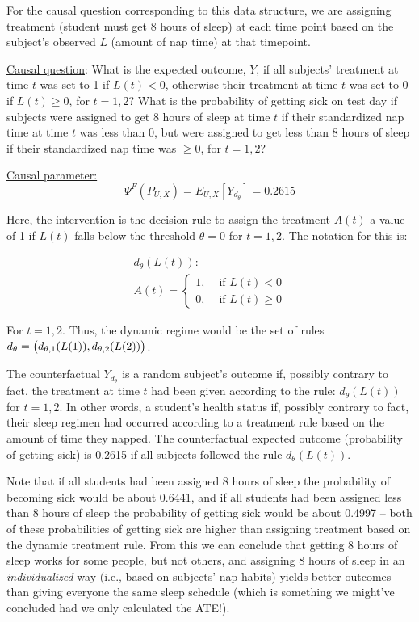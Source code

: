 \documentclass{exam}
\begin{document}
For the causal question corresponding to this data structure, we are assigning treatment (student must get 8 hours of sleep) at each time point based on the subject's observed $L$ (amount of nap time) at that timepoint.

\underline{Causal question}: What is the expected outcome, $Y$, if all subjects' treatment at time $t$ was set to 1 if $L(t) < 0$, otherwise their treatment at time $t$ was set to 0 if $L(t) \geq 0$, for $t = 1,2$? What is the probability of getting sick on test day if subjects were assigned to get 8 hours of sleep at time $t$ if their standardized nap time at time $t$ was less than 0, but were assigned to get less than 8 hours of sleep if their standardized nap time was $\geq 0$, for $t = 1,2$?


\underline{Causal parameter:} 
\[
\Psi^F(P_{U,X}) = E_{U,X}[Y_{d_\theta}] = 0.2615
\]

Here, the intervention is the decision rule to assign the treatment $A(t)$ a value of 1 if $L(t)$ falls below the threshold $\theta = 0$ for $t = 1,2$. The notation for this is:

\begin{align*}
d_\theta(L(t)): \\
A(t) = 
    \begin{cases}
      1, & \text{ if } L(t) < 0 \\
      0, & \text{ if } L(t) \geq 0
    \end{cases}
\end{align*}

For $t = 1,2$. Thus, the dynamic regime would be the set of rules $d_\theta = \big{(}d_{\theta,1}(L(1)), d_{\theta,2}(L(2))\big{)}$.

The counterfactual $Y_{d_\theta}$ is a random subject's outcome if, possibly contrary to fact, the treatment at time $t$ had been given according to the rule: $d_\theta(L(t))$ for $t = 1,2$. In other words, a student's health status if, possibly contrary to fact, their sleep regimen had occurred according to a treatment rule based on the amount of time they napped. The counterfactual expected outcome (probability of getting sick) is 0.2615 if all subjects followed the rule $d_\theta(L(t))$. 

Note that if all students had been assigned 8 hours of sleep the probability of becoming sick would be about 0.6441, and if all students had been assigned less than 8 hours of sleep the probability of getting sick would be about 0.4997 -- both of these probabilities of getting sick are higher than assigning treatment based on the dynamic treatment rule. From this we can conclude that getting 8 hours of sleep works for some people, but not others, and assigning 8 hours of sleep in an \textit{individualized} way (i.e., based on subjects' nap habits) yields better outcomes than giving everyone the same sleep schedule (which is something we might've concluded had we only calculated the ATE!). 
\end{document}
